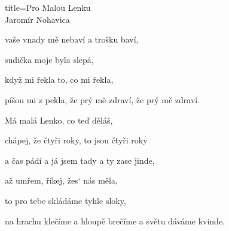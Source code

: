 \begin{song}{title=\centering Pro Malou Lenku \\\normalsize Jaromír Nohavica  \vspace*{-0.3cm}}
{vaše vnady mě nebaví a trošku baví,

sudička moje byla slepá,

když mi řekla to, co mi řekla,

píšou mi z pekla, že prý mě zdraví, že prý mě zdraví.




\sloka
Má malá Lenko, co teď děláš,

chápej, že čtyři roky, to jsou čtyři roky

a čas pádí a já jsem tady a ty zase jinde,

až umřem, říkej, žes‘ nás měla,

to pro tebe skládáme tyhle sloky,

na hrachu klečíme a hloupě brečíme a světu dáváme kvinde.
   



}
\setcounter{Slokočet}{0}
\end{song}
